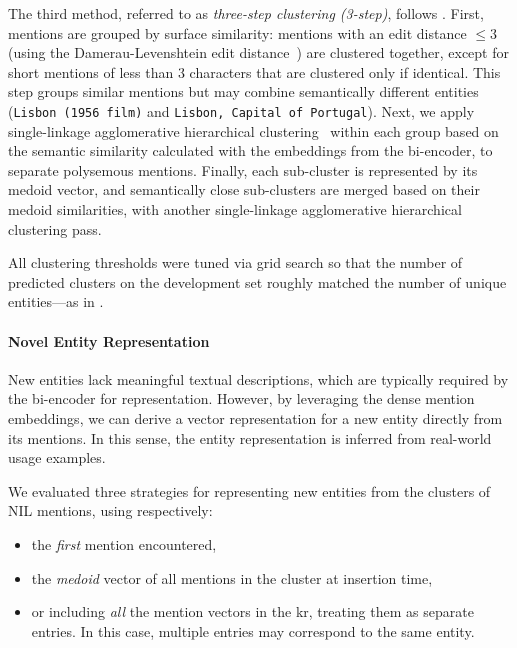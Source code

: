 The third method, referred to as \emph{three-step clustering (3-step)}, follows \textcite{simone_24}. First, mentions are grouped by surface similarity: mentions with an edit distance $\le 3$ (using the Damerau-Levenshtein edit distance~\cite{damerau1964}) are clustered together, except for short mentions of less than 3 characters that are clustered only if identical. This step groups similar mentions but may combine semantically different entities (\eg \texttt{Lisbon (1956 film)} and \texttt{Lisbon, Capital of Portugal}). Next, we apply single-linkage agglomerative hierarchical clustering~\cite{Rokach2005} within each group based on the semantic similarity calculated with the embeddings from the bi-encoder, to separate polysemous mentions. Finally, each sub-cluster is represented by its medoid vector, and semantically close sub-clusters are merged based on their medoid similarities, with another single-linkage agglomerative hierarchical clustering pass.

All clustering thresholds were tuned via grid search so that the number of predicted clusters on the development set roughly matched the number of unique entities---as in \textcite{streaming_crossdoc_coreference}.

\paragraph{Novel Entity Representation} New entities lack meaningful textual descriptions, which are typically required by the bi-encoder for representation. However, by leveraging the dense mention embeddings, we can derive a vector representation for a new entity directly from its mentions. In this sense, the entity representation is inferred from real-world usage examples.

We evaluated three strategies for representing new entities from the clusters of NIL mentions, using respectively:
\begin{itemize}
    \item the \textit{first} mention encountered,
    \item the \textit{medoid} vector of all mentions in the cluster at insertion time,
    \item or including \textit{all} the mention vectors in the \ac{kr}, treating them as separate entries. In this case, multiple entries may correspond to the same entity.
\end{itemize}

